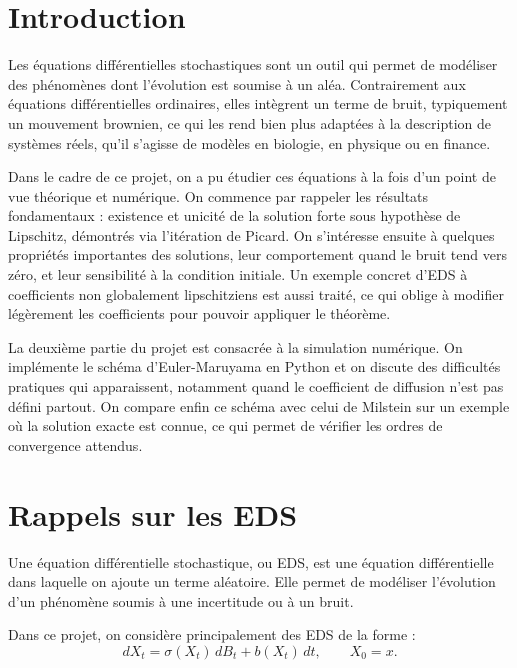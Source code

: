 \documentclass[12pt,a4paper]{article}
\theoremstyle{remark}
\begin{document}
\vspace*{1cm}
\newpage
\pagestyle{plain}
\section*{Introduction}

Les équations différentielles stochastiques sont un outil qui permet de modéliser des phénomènes dont l'évolution est soumise à un aléa. Contrairement aux équations différentielles ordinaires, elles intègrent un terme de bruit, typiquement un mouvement brownien, ce qui les rend bien plus adaptées à la description de systèmes réels, qu'il s'agisse de modèles en biologie, en physique ou en finance.

Dans le cadre de ce projet, on a pu étudier ces équations à la fois d'un point de vue théorique et numérique. On commence par rappeler les résultats fondamentaux : existence et unicité de la solution forte sous hypothèse de Lipschitz, démontrés via l'itération de Picard. On s'intéresse ensuite à quelques propriétés importantes des solutions, leur comportement quand le bruit tend vers zéro, et leur sensibilité à la condition initiale. Un exemple concret d'EDS à coefficients non globalement lipschitziens est aussi traité, ce qui oblige à modifier légèrement les coefficients pour pouvoir appliquer le théorème.

La deuxième partie du projet est consacrée à la simulation numérique. On implémente le schéma d'Euler-Maruyama en Python et on discute des difficultés pratiques qui apparaissent, notamment quand le coefficient de diffusion n'est pas défini partout. On compare enfin ce schéma avec celui de Milstein sur un exemple où la solution exacte est connue, ce qui permet de vérifier les ordres de convergence attendus.



\section{Rappels sur les EDS}

Une équation différentielle stochastique, ou EDS, est une équation différentielle dans laquelle on ajoute un terme aléatoire. Elle permet de modéliser l’évolution d’un phénomène soumis à une incertitude ou à un bruit.

Dans ce projet, on considère principalement des EDS de la forme :
\[
dX_t = \sigma(X_t)\,dB_t + b(X_t)\,dt,
\qquad X_0=x.
\]
\end{document}
